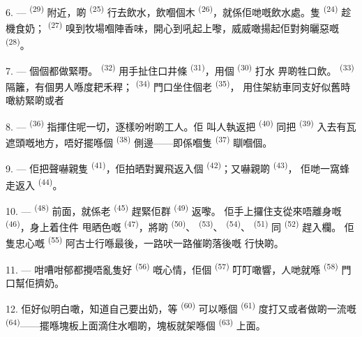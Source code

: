 6. ---  \textsuperscript{(29)} 附近，啲 \textsuperscript{(25)}
行去飲水，飲嗰個木 \textsuperscript{(26)}，就係佢哋嘅飲水處。隻
 \textsuperscript{(24)} 趁機食奶； \textsuperscript{(27)}
嗅到牧場嗰陣香味，開心到吼起上嚟，威威噉揚起佢對夠曬惡嘅
\textsuperscript{(28)}。

7. --- 個個都做緊嘢。 \textsuperscript{(32)} 用手扯住口井條
 \textsuperscript{(31)}，用個 \textsuperscript{(30)} 打水
畀啲牲口飲。 \textsuperscript{(33)} 隔籬，有個男人喺度耙禾稈；
 \textsuperscript{(34)} 門口坐住個老 \textsuperscript{(35)}，
用住架紡車同支好似舊時噉紡緊啲或者

\VUsaut{3.0mm}
\VUsaut{3.0mm}

8. ---  \textsuperscript{(36)} 指揮住呢一切，逐樣吩咐啲工人。佢
叫人執返把 \textsuperscript{(40)} 同把 \textsuperscript{(39)}
入去有瓦遮頭嘅地方，唔好擺喺個 \textsuperscript{(38)} 側邊——即係嗰隻
 \textsuperscript{(37)} 瞓嗰個。

9. --- 佢把聲嚇親隻 \textsuperscript{(41)}，佢拍晒對翼飛返入個
 \textsuperscript{(42)}；又嚇親啲 \textsuperscript{(43)}，
佢哋一窩蜂走返入 \textsuperscript{(44)}。

10. ---  \textsuperscript{(48)} 前面，就係老 \textsuperscript{(45)} 趕緊佢群 \textsuperscript{(49)} 返嚟。
佢手上攞住支從來唔離身嘅 \textsuperscript{(46)}，身上着住件
甩晒色嘅 \textsuperscript{(47)}，將啲 \textsuperscript{(50)}、
 \textsuperscript{(53)}、 \textsuperscript{(54)}、
 \textsuperscript{(51)} 同 \textsuperscript{(52)} 趕入欄。
佢隻忠心嘅 \textsuperscript{(55)} 阿古士行喺最後，一路吠一路催啲落後嘅
行快啲。

11. --- 咁嘈咁郁都攪唔亂隻好 \textsuperscript{(56)} 嘅心情，佢個
 \textsuperscript{(57)} 叮叮噉響，人哋就喺 \textsuperscript{(58)}
門口幫佢擠奶。

12. 佢好似明白噉，知道自己要出奶，等 \textsuperscript{(60)} 可以喺個
 \textsuperscript{(61)} 度打又或者做啲一流嘅
 \textsuperscript{(64)}——擺喺塊板上面滴住水嗰啲，塊板就架喺個
 \textsuperscript{(63)} 上面。

